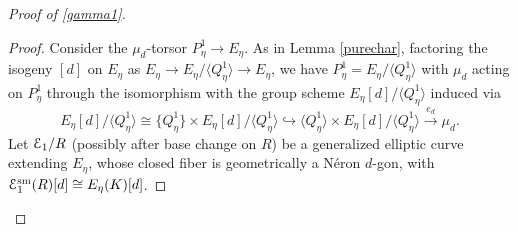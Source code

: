 \documentclass[11pt]{amsart}
\theoremstyle{definition}
\begin{document}
\begin{proof}[Proof of \ref{gamma1}]
\begin{proof}
Consider the $\mu_d$-torsor $P^1_\eta \rightarrow E_\eta$. As in Lemma \ref{purechar}, factoring the isogeny $[d]$ on $E_\eta$ as $E_\eta \rightarrow E_\eta/\langle Q^1_\eta \rangle \rightarrow E_\eta$, we have $P^1_\eta = E_\eta/\langle Q^1_\eta \rangle$ with $\mu_d$ acting on $P^1_\eta$ through the isomorphism with the group scheme $E_\eta[d]/\langle Q^1_\eta \rangle$ induced via 
\begin{displaymath}
E_\eta[d]/\langle Q^1_\eta \rangle \cong \{Q^1_\eta\} \times E_\eta[d]/\langle Q^1_\eta \rangle \hookrightarrow \langle Q^1_\eta \rangle \times E_\eta[d]/\langle Q^1_\eta \rangle \stackrel{e_d}{\rightarrow} \mu_d.
\end{displaymath}
Let ${\mathbf{\EuScript{E}}}_1/R$ (possibly after base change on $R$) be a generalized elliptic curve extending $E_\eta$, whose closed fiber is geometrically a N\'eron $d$-gon, with ${\mathbf{\EuScript{E}}}_1^{\mathrm{sm}}(R)[d] \cong E_\eta(K)[d]$. 


\end{proof}
\end{proof}
\end{document}
